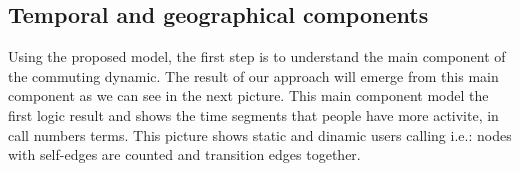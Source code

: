 \newpage
\subsection{Temporal and geographical components}

Using the proposed model, the first step is to understand the main component of the commuting dynamic. The result of our approach will emerge from this main component as we can see in the next picture. This main component model the first logic result and shows the time segments that people have more activite, in call numbers terms. This picture shows static and dinamic users calling i.e.: nodes with self-edges are counted and transition edges together.

\begin{figure}[ht]
\centering
{}
\label{fig:fig1}
\end{figure}

